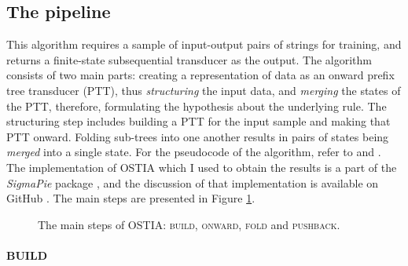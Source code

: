 \subsection{The pipeline}
\label{pipelinesec}

This algorithm requires a sample of input-output pairs of strings for training, and returns a finite-state subsequential transducer as the output.
The algorithm consists of two main parts: creating a representation of data as an onward prefix tree transducer (PTT), thus \emph{structuring} the input data, and \emph{merging} the states of the PTT, therefore, formulating the hypothesis about the underlying rule.
The structuring step includes building a PTT for the input sample and making that PTT onward.
Folding sub-trees into one another results in pairs of states being \emph{merged} into a single state.
For the pseudocode of the algorithm, refer to \cite{OncinaEtAl1993} and \cite{DeLaHiguera2010}.
The implementation of OSTIA which I used to obtain the results is a part of the \emph{SigmaPie} package \href{https://github.com/alenaks/SigmaPie}{\faGithub} \citep{GHsigmapie}, and the discussion of that implementation is available on GitHub \href{https://github.com/alenaks/OSTIA/blob/master/ostia.ipynb}{\faGithub} \citep{GHostia}.
The main steps are presented in Figure \ref{ostiamainsteps}.

\begin{figure}[h!] 
\centering
{}
\caption{The main steps of OSTIA: \textsc{build}, \textsc{onward}, \textsc{fold} and \textsc{pushback}.}
\label{ostiamainsteps}
\end{figure}



\paragraph{BUILD}

